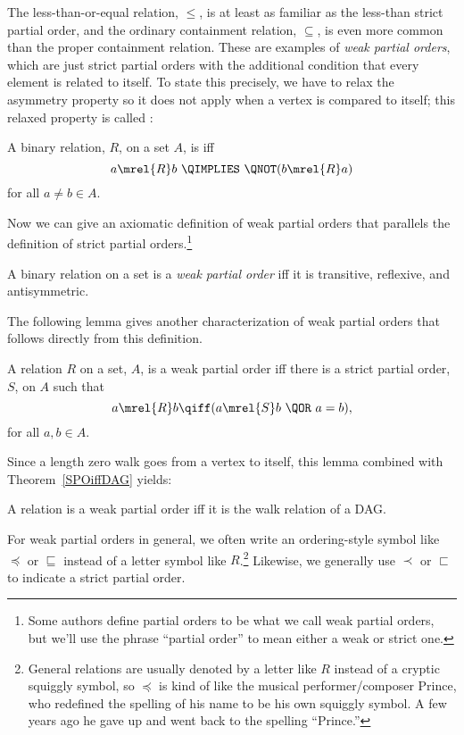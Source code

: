 \begin{definition}
The less-than-or-equal relation, $\leq$, is at least as familiar as
the less-than strict partial order, and the ordinary containment
relation, $\subseteq$, is even more common than the proper containment
relation.  These are examples of \emph{weak partial orders}, which are
just strict partial orders with the additional condition that every
element is related to itself.  To state this precisely, we have to
relax the asymmetry property so it does not apply when a vertex is
compared to itself; this relaxed property is called
:

\begin{definition}\label{antis}
A binary relation, $R$, on a set $A$, is  iff
\[
a \mrel{R}  b\ \QIMPLIES\ \QNOT(b \mrel{R}  a)
\]
for all $a \neq b \in A$.
\end{definition}

Now we can give an axiomatic definition of weak partial orders that
parallels the definition of strict partial orders.\footnote{Some
  authors define partial orders to be what we call weak partial
  orders, but we'll use the phrase ``partial order'' to mean either a
  weak or strict one.}

\begin{definition}\label{def:weakPO-axiom}
A binary relation on a set is a \emph{weak partial order} iff it is
transitive, reflexive, and antisymmetric.
\end{definition}

The following lemma gives another characterization of weak partial
orders that follows directly from this definition.
\begin{lemma}
A relation $R$ on a set, $A$, is a weak partial order iff
there is a strict partial order, $S$, on $A$ such that
\[
a \mrel{R} b \qiff (a \mrel{S} b\ \QOR\ a = b),
\]
for all $a,b \in A$.
\end{lemma}

Since a length zero walk goes from a vertex to itself, this lemma
combined with Theorem~\ref{SPOiffDAG} yields:
\begin{corollary}\label{weakPOiffDAGwalk}
A relation is a weak partial order iff it is the walk relation of a DAG.
\end{corollary}

For weak partial orders in general, we often write an ordering-style
symbol like $\preceq$ or $\sqsubseteq$ instead of a letter symbol like
$R$.\footnote{General relations are usually denoted by a letter like
  $R$ instead of a cryptic squiggly symbol, so $\preceq$ is kind of
  like the musical performer/composer Prince, who redefined the
  spelling of his name to be his own squiggly symbol.  A few years ago
  he gave up and went back to the spelling ``Prince.''}  Likewise, we
generally use $\prec$ or $\sqsubset$ to indicate a strict partial
order.


\end{definition}

